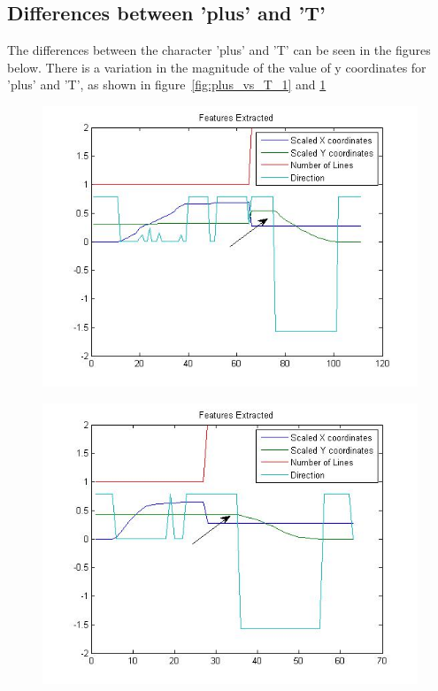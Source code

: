 \subsection{Differences between 'plus' and 'T'}
The differences between the character 'plus' and 'T' can be seen in the figures below. There is a variation in the magnitude of the value of y coordinates for 'plus' and 'T', as shown in figure~\ref{fig:plus_vs_T_1} and \ref{fig:plus_vs_T_2}

\begin{figure}[H]
	\centering
	\begin{minipage}{.4\textwidth}
		\centering
		\includegraphics[width=.99\linewidth]{images/deepas/plus}
		\label{fig:plus_vs_T_1}
	\end{minipage}
	\begin{minipage}{.4\textwidth}
		\centering
		\includegraphics[width=.99\linewidth]{images/deepas/T}
		\label{fig:plus_vs_T_2}
	\end{minipage}
\end{figure}
 
